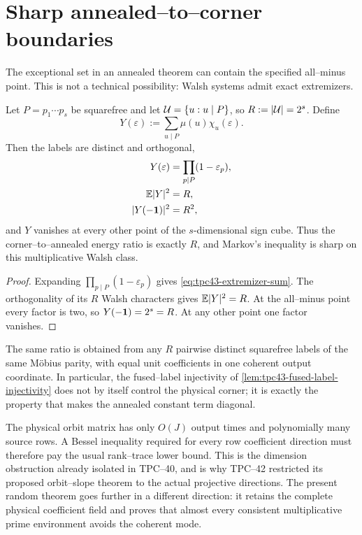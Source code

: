 \section{Sharp annealed--to--corner boundaries}
\label{sec:tpc43-sharp-boundaries}

The exceptional set in an annealed theorem can contain the specified
all--minus point.  This is not a technical possibility: Walsh systems
admit exact extremizers.

\begin{theorem}
\label{thm:tpc43-one-corner-extremizer}
Let \(P=p_1\cdots p_s\) be squarefree and let
\(\mathcal U=\{u:u\mid P\}\), so \(R:=|\mathcal U|=2^s\).  Define
\begin{equation}
 Y(\varepsilon)
 :=\sum_{u\mid P}\mu(u)\chi_u(\varepsilon).
 \label{eq:tpc43-extremizer-sum}
\end{equation}
Then the labels are distinct and orthogonal,
\begin{align}
 Y(\varepsilon)
 &=\prod_{p\mid P}(1-\varepsilon_p),
 \label{eq:tpc43-extremizer-product}\\
 \mathbb E|Y|^2&=R,
 \label{eq:tpc43-extremizer-mean}\\
 |Y(-\mathbf 1)|^2&=R^2,
 \label{eq:tpc43-extremizer-corner}
\end{align}
and \(Y\) vanishes at every other point of the \(s\)-dimensional sign
cube.  Thus the corner--to--annealed energy ratio is exactly \(R\), and
Markov's inequality is sharp on this multiplicative Walsh class.
\end{theorem}

\begin{proof}
Expanding \(\prod_{p\mid P}(1-\varepsilon_p)\) gives
\eqref{eq:tpc43-extremizer-sum}.  The orthogonality of its \(R\) Walsh
characters gives \(\mathbb E|Y|^2=R\).  At the all--minus point every factor is
two, so \(Y(-\mathbf 1)=2^s=R\).  At any other point one factor vanishes.
\end{proof}

The same ratio is obtained from any \(R\) pairwise distinct squarefree
labels of the same M\"obius parity, with equal unit coefficients in one
coherent output coordinate.  In particular, the fused--label injectivity of
\cref{lem:tpc43-fused-label-injectivity} does not by itself control the
physical corner; it is exactly the property that makes the annealed
constant term diagonal.

\begin{remark}
\label{rem:tpc43-no-universal-row-theorem}
The physical orbit matrix has only \(O(J)\) output times and polynomially
many source rows.  A Bessel inequality required for every row coefficient
direction must therefore pay the usual rank--trace lower bound.  This is
the dimension obstruction already isolated in TPC--40, and is why
TPC--42 restricted its proposed orbit--slope theorem to the actual
projective directions.  The present random theorem goes further in a
different direction: it retains the complete physical coefficient field
and proves that almost every consistent multiplicative prime environment
avoids the coherent mode.
\end{remark}

